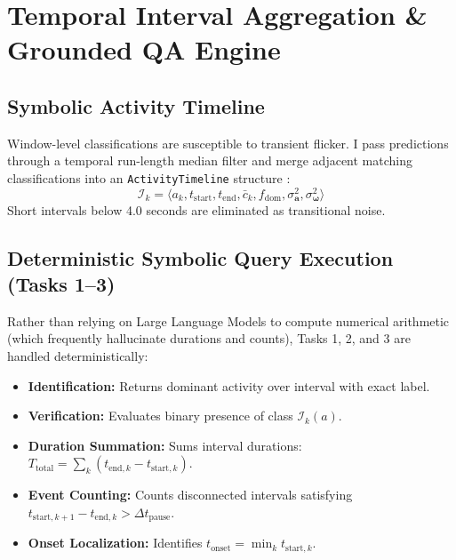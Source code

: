 \documentclass[11pt,a4paper]{article}
\begin{document}
\section{Temporal Interval Aggregation \& Grounded QA Engine}
\subsection{Symbolic Activity Timeline}
Window-level classifications are susceptible to transient flicker. I pass predictions through a temporal run-length median filter and merge adjacent matching classifications into an \texttt{ActivityTimeline} structure \cite{allen1983maintaining}:
\begin{equation}
\mathcal{I}_k = \langle a_k, t_{\text{start}}, t_{\text{end}}, \bar{c}_k, f_{\text{dom}}, \sigma^2_{\mathbf{a}}, \sigma^2_{\boldsymbol{\omega}} \rangle
\end{equation}
Short intervals below 4.0 seconds are eliminated as transitional noise.

\subsection{Deterministic Symbolic Query Execution (Tasks 1--3)}
Rather than relying on Large Language Models to compute numerical arithmetic (which frequently hallucinate durations and counts), Tasks 1, 2, and 3 are handled deterministically:
\begin{itemize}
    \item \textbf{Identification:} Returns dominant activity over interval with exact label.
    \item \textbf{Verification:} Evaluates binary presence of class $\mathcal{I}_k(a)$.
    \item \textbf{Duration Summation:} Sums interval durations: $T_{\text{total}} = \sum_{k} (t_{\text{end}, k} - t_{\text{start}, k})$.
    \item \textbf{Event Counting:} Counts disconnected intervals satisfying $t_{\text{start}, k+1} - t_{\text{end}, k} > \Delta t_{\text{pause}}$.
    \item \textbf{Onset Localization:} Identifies $t_{\text{onset}} = \min_k t_{\text{start}, k}$.
\end{itemize}
\end{document}
